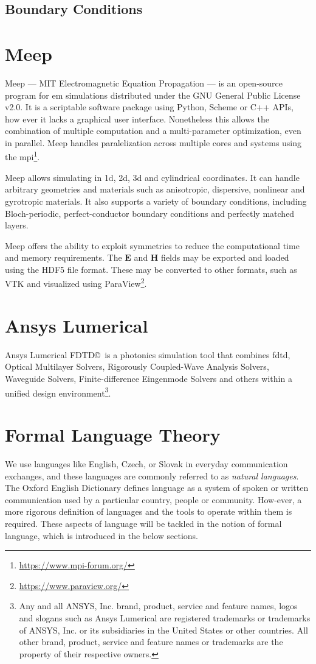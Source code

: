 \subsection{Boundary Conditions}

\section{Meep}
Meep --- MIT Electromagnetic Equation Propagation --- is an open-source program for \gls{em} simulations distributed under the GNU General Public License v2.0. It is a scriptable software package using Python, Scheme or C++ APIs, how ever it lacks a graphical user interface. Nonetheless this allows the combination of multiple computation and a multi-parameter optimization, even in parallel. Meep handles paralelization across multiple cores and systems using the \gls{mpi}\footnote{\url{https://www.mpi-forum.org/}}. 

Meep allows simulating in \gls{1d}, \gls{2d}, \gls{3d} and cylindrical coordinates. It can handle arbitrary geometries and materials such as anisotropic, dispersive, nonlinear and gyrotropic materials. It also supports a variety of boundary conditions, including Bloch-periodic, perfect-conductor boundary conditions and perfectly matched layers. 

Meep offers the ability to exploit symmetries to reduce the computational time and memory requirements. The $\mathbf{E}$ and $\mathbf{H}$ fields may be exported and loaded using the HDF5 file format. These may be converted to other formats, such as VTK and visualized using ParaView\footnote{\url{https://www.paraview.org/}}. 

\section{Ansys Lumerical}
Ansys Lumerical FDTD\copyright \ is a photonics simulation tool that combines \gls{fdtd}, Optical Multilayer Solvers, Rigorously Coupled-Wave Analysis Solvers, Waveguide Solvers, Finite-difference Eingenmode Solvers and others within a unified design environment\footnote{Any and all ANSYS, Inc. brand, product, service and feature names, logos and slogans such as Ansys Lumerical are registered trademarks or trademarks of ANSYS, Inc. or its subsidiaries in the United States or other countries. All other brand, product, service and feature names or trademarks are the property of their respective owners.}.


\section{Formal Language Theory}
We use languages like English, Czech, or Slovak in everyday communication exchanges, and these languages are commonly referred to as \emph{natural languages}. The Oxford English Dictionary defines language as a system of spoken or written communication used by a particular country, people or community. How-ever, a more rigorous definition of languages and the tools to operate within them is required. These aspects of language will be tackled in the notion of formal language, which is introduced in the below sections.

